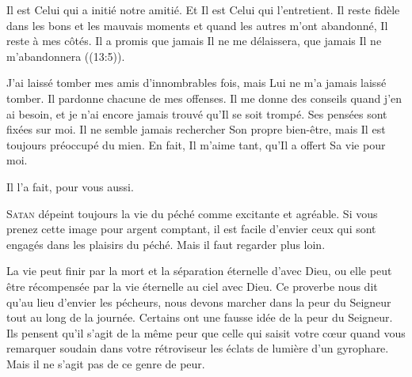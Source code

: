 Il est Celui qui a initié notre amitié. Et Il est Celui qui l'entretient.
 Il reste fidèle dans les bons et les mauvais moments et quand les autres
 m'ont abandonné, Il reste à mes côtés. Il a promis que jamais
 Il ne me délaissera, que jamais Il ne m'abandonnera ((13:5)).

J'ai laissé tomber mes amis d'innombrables fois, mais Lui ne m'a jamais laissé
 tomber. Il pardonne chacune de mes offenses. Il me donne des conseils
 quand j'en ai besoin, et je n'ai encore jamais trouvé qu'Il se soit trompé.
 Ses pensées sont fixées sur moi. 
 Il ne semble jamais rechercher 
 Son propre bien-être, mais Il est toujours préoccupé du mien.
 En fait, Il m'aime tant, qu'Il a offert Sa vie pour moi.

Il l'a fait, pour vous aussi.

\dvrule







\lettrine{S}{atan} dépeint toujours la vie du péché
 comme excitante et agréable.
 Si vous prenez cette image pour argent comptant,
 il est facile d'envier ceux qui sont engagés
 dans les plaisirs du péché. Mais il faut regarder plus loin. 


La vie peut finir par la mort et la séparation éternelle d'avec Dieu,
 ou elle peut être récompensée par la vie éternelle au ciel avec Dieu.
 Ce proverbe nous dit qu'au lieu d'envier les pécheurs,
 nous devons marcher dans la peur 
 du Seigneur tout au long de la journée.
 Certains ont une fausse idée de la peur du Seigneur.
 Ils pensent qu'il s'agit de la même peur que celle qui saisit votre c\oe{}ur
 quand vous remarquer soudain dans votre rétroviseur les éclats de lumière
 d'un gyrophare. Mais il ne s'agit pas de ce genre de peur. 

